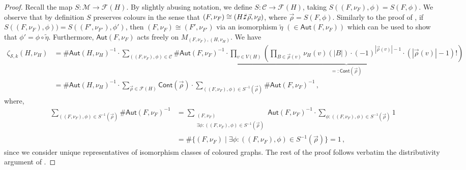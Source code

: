 \documentclass[authorcolumns,numberwithinsect]{no-lipics-v2022}
\def\fracture#1#2{\ensuremath{#1\raisebox{.2ex}{\rotatebox[origin=c]{-15}{$\sharp$}}#2}}
\def\fracture#1#2{\ensuremath{#1\raisebox{.2ex}{\rotatebox[origin=c]{-15}{$\sharp$}}#2}}
\begin{document}
\begin{proof}
Recall the map $S : \mathcal{M} \to \mathcal{F}(H)$. By slightly abusing notation, we define $S : \mathcal{C} \to \mathcal{F}(H)$, taking $S((F, \nu_F), \phi) = S(F, \phi)$. We observe that by definition $S$ preserves colours in the sense that $(F, \nu_F) \cong (\fracture{H}{\vec\rho}, \nu_{\vec\rho})$, where $\vec\rho = S(F, \phi)$. Similarly to the proof of , if $S((F, \nu_F), \phi)) = S((F', \nu_{F'}), \phi')$, then $(F, \nu_F) \cong (F', \nu_{F'})$ via an isomorphism $\widetilde{\eta}$ $(\in \mathsf{Aut}(F, \nu_F))$ which can be used to show that $\phi' = \phi \circ \widetilde{\eta}$. 
Furthermore, $\mathsf{Aut}(F, \nu_F)$ acts freely on $M_{(F, \nu_F), (H, \nu_H)}$. We have
\begin{align*}
\zeta_{\mathcal{S}, k}(H, \nu_H) &= \#\mathsf{Aut}(H, \nu_H)^{-1} \cdot \sum_{((F,\nu_F),\phi) \in \mathcal{C}} \#\mathsf{Aut}(F, \nu_F)^{-1}\cdot  \underbrace{\prod_{v\in V(H)}\left(\prod_{B \in \vec\rho(v)} \nu_H(v)(|B|) \cdot (-1)^{|\vec\rho(v)| -1} \cdot (|\vec\rho(v)|-1)! \right)}_{=:\mathsf{Cont}(\vec\rho)} \\ &= \#\mathsf{Aut}(H, \nu_H)^{-1}\cdot\sum_{\vec\rho \in \mathcal{F}(H)}\mathsf{Cont}(\vec\rho)\cdot\sum_{((F, \nu_F), \phi) \in S^{-1}(\vec\rho)}\#\mathsf{Aut}(F, \nu_F)^{-1}\,,
\end{align*}
where,
\begin{align*}
\sum_{((F, \nu_F), \phi) \in S^{-1}(\vec\rho)}\#\mathsf{Aut}(F, \nu_F)^{-1} &= \sum_{\substack{(F, \nu_F) \\ \exists \phi : ((F, \nu_F), \phi) \in S^{-1}(\vec\rho)}}\mathsf{Aut}(F, \nu_F)^{-1}\cdot\sum_{\phi: ((F, \nu_F), \phi) \in S^{-1}(\vec\rho)}1 \\ &= \#\{{(F, \nu_F) \mid \exists\phi : ((F, \nu_F), \phi) \in S^{-1}(\vec\rho)}\} = 1\,,    
\end{align*}
since we consider unique representatives of isomorphism classes of coloured graphs.
The rest of the proof follows verbatim the distributivity argument of .
\end{proof}
\end{document}
